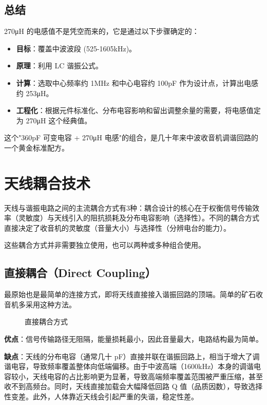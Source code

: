 \documentclass[12pt,UTF8]{ctexbook}
\begin{document}
\section{总结}

270μH 的电感值不是凭空而来的，它是通过以下步骤确定的：

\begin{itemize}[leftmargin=2cm]
	\item \textbf{目标}：覆盖中波波段 (525-1605kHz)。
	\item \textbf{原理}：利用 LC 谐振公式。
	\item \textbf{计算}：选取中心频率约 1MHz 和中心电容约 100pF 作为设计点，计算出电感约 253μH。
	\item \textbf{工程化}：根据元件标准化、分布电容影响和留出调整余量的需要，将电感值定为 270μH 这个经典值。
\end{itemize}

这个"360pF 可变电容 + 270μH 电感"的组合，是几十年来中波收音机调谐回路的一个黄金标准配方。


\chapter{天线耦合技术}
\label{chap:antenna-coupling}

天线与谐振电路之间的主流耦合方式有3种：耦合设计的核心在于权衡信号传输效率（灵敏度）与天线引入的阻抗损耗及分布电容影响（选择性）。不同的耦合方式直接决定了收音机的灵敏度（音量大小）与选择性（分辨电台的能力）。

这些耦合方式并非需要独立使用，也可以两种或多种组合使用。

\section{直接耦合（Direct Coupling）}

最原始也是最简单的连接方式，即将天线直接接入谐振回路的顶端。简单的矿石收音机多采用这种方法。

\begin{figure}[H]
	\centering
	\caption{直接耦合方式}
	\label{fig:direct-coupling}
\end{figure}

\textbf{优点}：信号传输路径无阻隔，能量损耗最小，因此音量最大，电路结构最为简单。

\textbf{缺点}：天线的分布电容（通常几十 pF）直接并联在谐振回路上，相当于增大了调谐电容，导致频率覆盖整体向低端偏移。由于中波高端（1600kHz）本身的调谐电容较小，天线电容的占比影响更为显著，导致高端频率覆盖范围被严重压缩，甚至收不到高频台。同时，天线直接加载会大幅降低回路 Q 值（品质因数），导致选择性变差。此外，人体靠近天线会引起严重的失谐，稳定性差。
\end{document}
